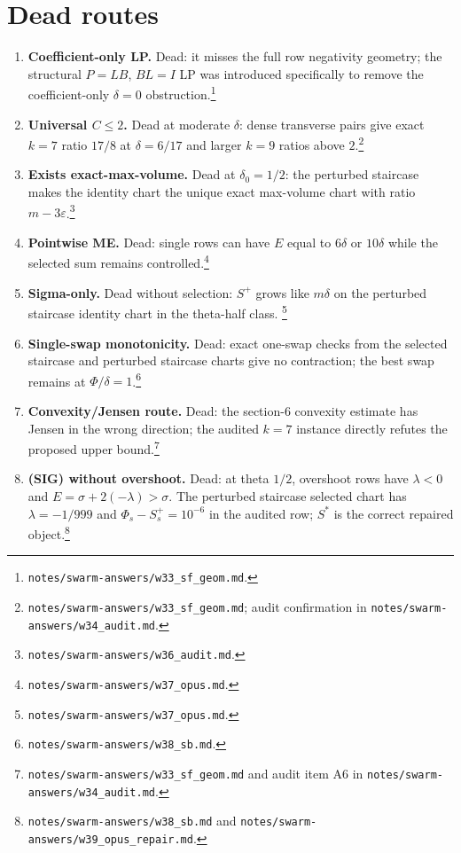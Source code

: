 \documentclass[11pt]{article}
\theoremstyle{plain}
\theoremstyle{definition}
\theoremstyle{remark}
\begin{document}
\section{Dead routes}

\begin{enumerate}
\item \textbf{Coefficient-only LP.}  Dead: it misses the full row negativity
geometry; the structural $P=LB$, $BL=I$ LP was introduced specifically to remove
the coefficient-only $\delta=0$ obstruction.\footnote{
\texttt{notes/swarm-answers/w33\_sf\_geom.md}.}

\item \textbf{Universal $C\le2$.}  Dead at moderate $\delta$: dense transverse
pairs give exact $k=7$ ratio $17/8$ at $\delta=6/17$ and larger $k=9$ ratios
above $2$.\footnote{\texttt{notes/swarm-answers/w33\_sf\_geom.md};
audit confirmation in \texttt{notes/swarm-answers/w34\_audit.md}.}

\item \textbf{Exists exact-max-volume.}  Dead at $\delta_0=1/2$: the perturbed
staircase makes the identity chart the unique exact max-volume chart with
ratio $m-3\varepsilon$.\footnote{\texttt{notes/swarm-answers/w36\_audit.md}.}

\item \textbf{Pointwise ME.}  Dead: single rows can have $E$ equal to
$6\delta$ or $10\delta$ while the selected sum remains controlled.\footnote{
\texttt{notes/swarm-answers/w37\_opus.md}.}

\item \textbf{Sigma-only.}  Dead without selection: $S^+$ grows like
$m\delta$ on the perturbed staircase identity chart in the theta-half class.
\footnote{\texttt{notes/swarm-answers/w37\_opus.md}.}

\item \textbf{Single-swap monotonicity.}  Dead: exact one-swap checks from the
selected staircase and perturbed staircase charts give no contraction; the best
swap remains at $\Phi/\delta=1$.\footnote{
\texttt{notes/swarm-answers/w38\_sb.md}.}

\item \textbf{Convexity/Jensen route.}  Dead: the section-6 convexity estimate
has Jensen in the wrong direction; the audited $k=7$ instance directly refutes
the proposed upper bound.\footnote{\texttt{notes/swarm-answers/w33\_sf\_geom.md}
and audit item A6 in \texttt{notes/swarm-answers/w34\_audit.md}.}

\item \textbf{\textup{(SIG)} without overshoot.}  Dead: at theta $1/2$,
overshoot rows have $\lambda<0$ and
$E=\sigma+2(-\lambda)>\sigma$.  The perturbed staircase selected chart has
$\lambda=-1/999$ and $\Phi_s-S^+_s=10^{-6}$ in the audited row; $S^*$ is the
correct repaired object.\footnote{\texttt{notes/swarm-answers/w38\_sb.md} and
\texttt{notes/swarm-answers/w39\_opus\_repair.md}.}
\end{enumerate}
\end{document}
